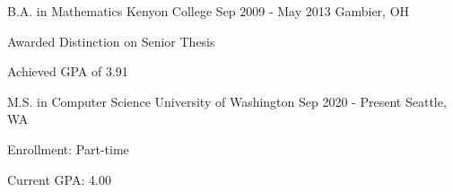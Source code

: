 
\vspace{-3mm}

\begin{minipage}[t]{.49\textwidth}
\begin{cventries}
  \cventry
  {B.A. in Mathematics}
    {Kenyon College}
    {Sep 2009 - May 2013}
    {Gambier, OH}
    {
      \begin{cvitems}
        \item {Awarded Distinction on Senior Thesis}
        \item {Achieved GPA of 3.91}
      \end{cvitems}
    }
\end{cventries}
\end{minipage}
\hspace{.02\textwidth}
\begin{minipage}[t]{.49\textwidth}
\begin{cventries}
  \cventry
  {M.S. in Computer Science}
    {University of Washington}
    {Sep 2020 - Present}
    {Seattle, WA}
    {
      \begin{cvitems}
        \item {Enrollment: Part-time}
        \item {Current GPA: 4.00}
      \end{cvitems}
    }
\end{cventries}

\end{minipage}

